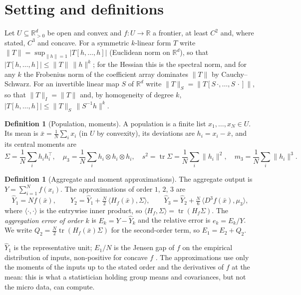 \documentclass[10pt,a4paper]{article}
\theoremstyle{plain}
\theoremstyle{definition}
\newtheorem{definition}[theorem]{Definition}
\theoremstyle{remark}
\newcommand{\R}{\mathbb{R}}
\newcommand{\tr}{\operatorname{tr}}
\newcommand{\Yh}{\widehat{Y}}
\newcommand{\Hf}{H_f}
\begin{document}
\section{Setting and definitions}\label{sec:setting}

Let $U\subseteq\R^d_{>0}$ be open and convex and $f\colon U\to\R$ a frontier, at least $C^2$ and, where stated, $C^3$ and concave. For a symmetric $k$-linear form $T$ write $\|T\|=\sup_{\|h\|=1}|T[h,\dots,h]|$ (Euclidean norm on $\R^d$), so that $|T[h,\dots,h]|\le\|T\|\,\|h\|^k$; for the Hessian this is the spectral norm, and for any $k$ the Frobenius norm of the coefficient array dominates $\|T\|$ by Cauchy--Schwarz. For an invertible linear map $S$ of $\R^d$ write $\|T\|_S=\|T[S\,\cdot,\dots,S\,\cdot]\|$, so that $\|T\|_I=\|T\|$ and, by homogeneity of degree $k$, $|T[h,\dots,h]|\le\|T\|_S\,\|S^{-1}h\|^k$.

\begin{definition}[Population, moments]\label{def:pop}
A population is a finite list $x_1,\dots,x_N\in U$. Its mean is $\bar x=\frac1N\sum_i x_i$ (in $U$ by convexity), its deviations are $h_i=x_i-\bar x$, and its central moments are
\[
\Sigma=\frac1N\sum_i h_ih_i^{\!\top},\quad \mu_3=\frac1N\sum_i h_i\otimes h_i\otimes h_i,\quad
s^2=\tr\Sigma=\frac1N\sum_i\|h_i\|^2,\quad m_3=\frac1N\sum_i\|h_i\|^3 .
\]
\end{definition}

\begin{definition}[Aggregate and moment approximations]\label{def:approx}
The aggregate output is $Y=\sum_{i=1}^N f(x_i)$. The approximations of order $1$, $2$, $3$ are
\[
\Yh_1=Nf(\bar x),\qquad
\Yh_2=\Yh_1+\tfrac{N}{2}\,\langle \Hf(\bar x),\Sigma\rangle,\qquad
\Yh_3=\Yh_2+\tfrac{N}{6}\,\langle D^3\!f(\bar x),\mu_3\rangle ,
\]
where $\langle\cdot,\cdot\rangle$ is the entrywise inner product, so $\langle \Hf,\Sigma\rangle=\tr(\Hf\Sigma)$. The \emph{aggregation error of order $k$} is $E_k=Y-\Yh_k$ and the relative error is $e_k=E_k/Y$. We write $Q_2=\tfrac N2\tr(\Hf(\bar x)\Sigma)$ for the second-order term, so $E_1=E_2+Q_2$.
\end{definition}

$\Yh_1$ is the representative unit; $E_1/N$ is the Jensen gap of $f$ on the empirical distribution of inputs, non-positive for concave $f$ \citep{jensen1906}. The approximations use only the moments of the inputs up to the stated order and the derivatives of $f$ at the mean: this is what a statistician holding group means and covariances, but not the micro data, can compute.
\end{document}
